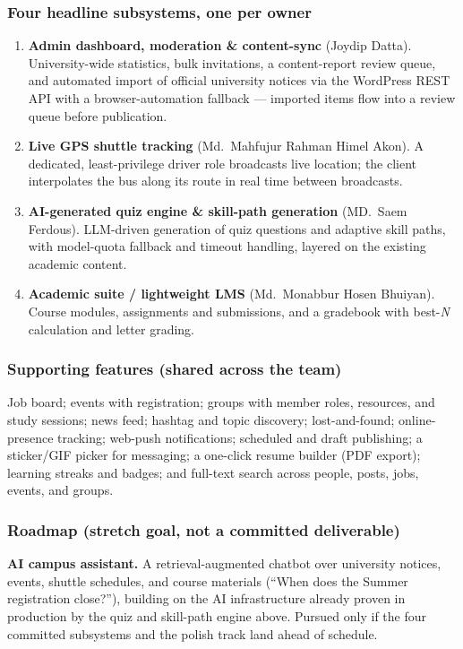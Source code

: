 \documentclass[11pt, a4paper]{article}
\begin{document}
\subsubsection*{Four headline subsystems, one per owner}
\begin{enumerate}[leftmargin=1.5em, itemsep=4pt]
    \item \textbf{Admin dashboard, moderation \& content-sync} (Joydip
    Datta). University-wide statistics, bulk invitations, a
    content-report review queue, and automated import of official
    university notices via the WordPress REST API with a browser-automation
    fallback --- imported items flow into a review queue before publication.
    \item \textbf{Live GPS shuttle tracking} (Md.\ Mahfujur Rahman Himel
    Akon). A dedicated, least-privilege driver role broadcasts live
    location; the client interpolates the bus along its route in real time
    between broadcasts.
    \item \textbf{AI-generated quiz engine \& skill-path generation}
    (MD.\ Saem Ferdous). LLM-driven generation of quiz questions and
    adaptive skill paths, with model-quota fallback and timeout handling,
    layered on the existing academic content.
    \item \textbf{Academic suite / lightweight LMS} (Md.\ Monabbur Hosen
    Bhuiyan). Course modules, assignments and submissions, and a gradebook
    with best-\emph{N} calculation and letter grading.
\end{enumerate}

\subsubsection*{Supporting features (shared across the team)}
Job board; events with registration; groups with member roles, resources,
and study sessions; news feed; hashtag and topic discovery; lost-and-found;
online-presence tracking; web-push notifications; scheduled and draft
publishing; a sticker/GIF picker for messaging; a one-click resume builder
(PDF export); learning streaks and badges; and full-text search across
people, posts, jobs, events, and groups.

\subsubsection*{Roadmap (stretch goal, not a committed deliverable)}
\textbf{AI campus assistant.} A retrieval-augmented chatbot over university
notices, events, shuttle schedules, and course materials (``When does the
Summer registration close?''), building on the AI infrastructure already
proven in production by the quiz and skill-path engine above. Pursued only
if the four committed subsystems and the polish track land ahead of
schedule.
\end{document}

